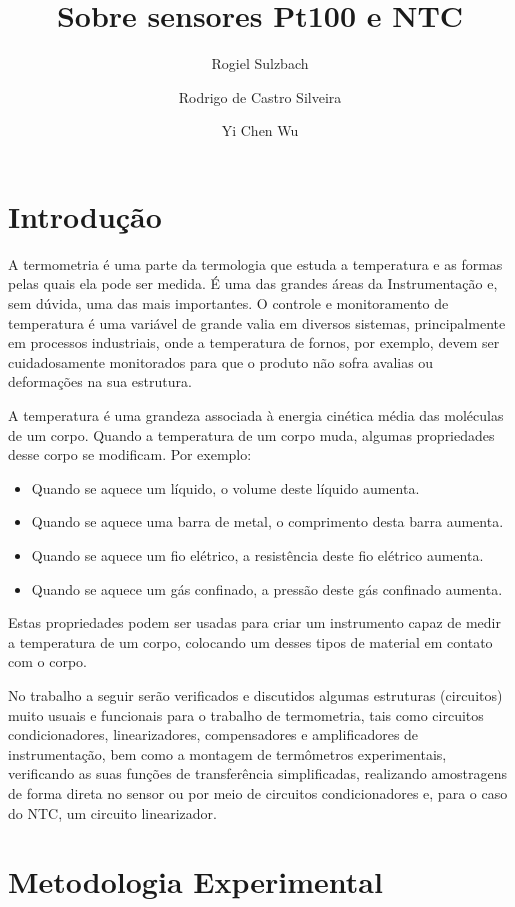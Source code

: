 \documentclass[a4paper]{instrumentacao}
\title{Sobre sensores Pt100 e NTC}
\author{Rogiel Sulzbach \and Rodrigo de Castro Silveira \and Yi Chen Wu}
\institute{Universidade Federal do Rio Grande do Sul, Departamento de Engenharia Elétrica, Curso de Engenharia Elétrica, Instrumentação A, Profs. Dr. Alexandre Balbinot e Dra. Léia Bagesteiro}
\begin{document}
\fontsize{13pt}{15pt}\selectfont

\maketitle

\chapter{Introdução}
A termometria é uma parte da termologia que estuda a temperatura e as formas pelas quais ela pode ser medida.  É uma das grandes áreas da Instrumentação e, sem dúvida, uma das mais importantes. O controle e monitoramento de temperatura é uma variável de grande valia em diversos sistemas, principalmente em processos industriais, onde a temperatura de fornos, por exemplo, devem ser cuidadosamente monitorados para que o produto não sofra avalias ou deformações na sua estrutura.

A temperatura é uma grandeza associada à energia cinética média das moléculas de um corpo. Quando a temperatura de um corpo muda, algumas propriedades desse corpo se modificam. Por exemplo:

\begin{itemize}
	\item Quando se aquece um líquido, o volume deste líquido aumenta.
	\item Quando se aquece uma barra de metal, o comprimento desta barra aumenta.
	\item Quando se aquece um fio elétrico, a resistência deste fio elétrico aumenta.
	\item Quando se aquece um gás confinado, a pressão deste gás confinado aumenta.
\end{itemize}

Estas propriedades podem ser usadas para criar um instrumento capaz de medir a temperatura de um corpo, colocando um desses tipos de material em contato com o corpo.

No trabalho a seguir serão verificados e discutidos algumas estruturas (circuitos) muito usuais e funcionais para o trabalho de termometria, tais como circuitos condicionadores, linearizadores, compensadores e amplificadores de instrumentação, bem como a montagem de termômetros experimentais, verificando as suas funções de transferência simplificadas, realizando amostragens de forma direta no sensor ou por meio de circuitos condicionadores e, para o caso do NTC, um circuito linearizador.

\chapter{Metodologia Experimental}
\end{document}
